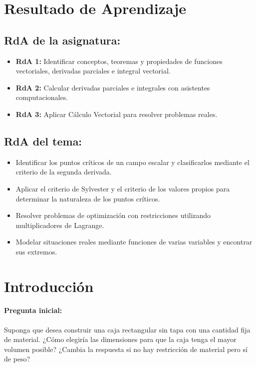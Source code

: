 \documentclass[a4,11pt]{aleph-notas}
\begin{document}
\encabezado

\section*{Resultado de Aprendizaje}

\subsection*{RdA de la asignatura:}
\begin{itemize}[leftmargin=*]
    \item \textbf{RdA 1:} Identificar conceptos, teoremas y propiedades de funciones vectoriales, derivadas parciales e integral vectorial.
    \item \textbf{RdA 2:} Calcular derivadas parciales e integrales con asistentes computacionales.
    \item \textbf{RdA 3:} Aplicar Cálculo Vectorial para resolver problemas reales.
\end{itemize}

\subsection*{RdA del tema:}
\begin{itemize}[leftmargin=*]
    \item Identificar los puntos críticos de un campo escalar y clasificarlos mediante el criterio de la segunda derivada.
    \item Aplicar el criterio de Sylvester y el criterio de los valores propios para determinar la naturaleza de los puntos críticos.
    \item Resolver problemas de optimización con restricciones utilizando multiplicadores de Lagrange.
    \item Modelar situaciones reales mediante funciones de varias variables y encontrar sus extremos.
\end{itemize}

\section*{Introducción}

\paragraph{Pregunta inicial:}
Suponga que desea construir una caja rectangular sin tapa con una cantidad fija de material. ¿Cómo elegiría las dimensiones para que la caja tenga el mayor volumen posible? ¿Cambia la respuesta si no hay restricción de material pero sí de peso?
\end{document}
